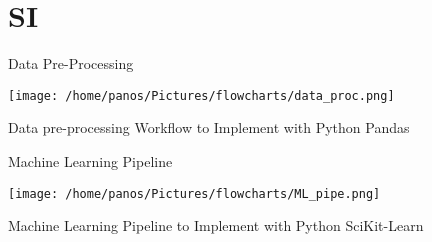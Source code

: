 \documentclass[10pt, compress, aspectratio=169]{beamer}
\begin{document}
\section{SI}
\label{sec:org2778532}
\begin{frame}[label={sec:orge0924f0}]{Data Pre-Processing}
\begin{center}
\texttt{[image: /home/panos/Pictures/flowcharts/data\_proc.png]}
\end{center}
Data pre-processing Workflow to Implement with Python Pandas
\end{frame}
\begin{frame}[label={sec:orga7b1a97}]{Machine Learning Pipeline}
\begin{center}
\texttt{[image: /home/panos/Pictures/flowcharts/ML\_pipe.png]}
\end{center}
Machine Learning Pipeline to Implement with Python SciKit-Learn
\end{frame}
\end{document}
